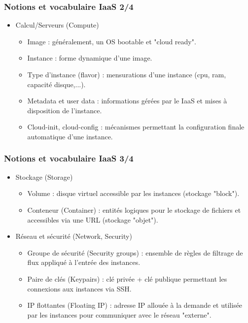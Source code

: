   \begin{frame}
    \frametitle{Notions et vocabulaire IaaS 2/4}
    \begin{itemize}
      \item Calcul/Serveurs (Compute) \pause
      \begin{itemize}
        \item Image : généralement, un OS bootable et "cloud ready". \pause
        \item Instance : forme dynamique d'une image. \pause
        \item Type d'instance (flavor) : mensurations d'une instance (cpu, ram, capacité disque,...). \pause
        \item Metadata et user data : informations gérées par le IaaS et mises à disposition de l'instance. \pause
        \item Cloud-init, cloud-config : mécanismes permettant la configuration finale automatique d'une instance.
      \end{itemize}
    \end{itemize}
  \end{frame}

  \begin{frame}
    \frametitle{Notions et vocabulaire IaaS 3/4}
    \begin{itemize}
      \item Stockage (Storage) \pause
      \begin{itemize}
        \item Volume : disque virtuel accessible par les instances (stockage "block"). \pause
        \item Conteneur (Container) : entités logiques pour le stockage de fichiers et accessibles via une URL (stockage "objet"). \pause
      \end{itemize}
      \item Réseau et sécurité (Network, Security) \pause
      \begin{itemize}
        \item Groupe de sécurité (Security groups) : ensemble de règles de filtrage de flux appliqué à l'entrée des instances. \pause
        \item Paire de clés (Keypairs) : clé privée + clé publique permettant les connexions aux instances via SSH. \pause
        \item IP flottantes (Floating IP) : adresse IP allouée à la demande et utilisée par les instances pour communiquer avec le réseau "externe".
      \end{itemize}
    \end{itemize}
  \end{frame}

